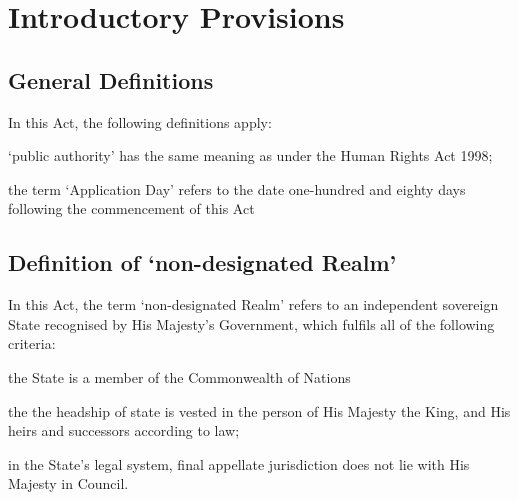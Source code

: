 \documentclass{ukbill}
\begin{document}
\chapter{Introductory Provisions}
\section{General Definitions}

\begin{numstat}
\item In this Act, the following definitions apply:
\begin{alphstat} 
	\item `public authority' has the same meaning as under the Human Rights Act 1998;
	\item the term `Application Day' refers to the date one-hundred and eighty days following the commencement of this Act
	\end{alphstat}
\end{numstat}

\section{Definition of `non-designated Realm'}
\begin{numstat}
	\item In this Act, the term `non-designated Realm' refers to an independent sovereign State recognised by His Majesty's Government, which fulfils all of the following criteria:
\begin{alphstat}
\item the State is a member of the Commonwealth of Nations
\item the the headship of state is vested in the person of His Majesty the King, and His heirs and successors according to law;
\item in the State's legal system, final appellate jurisdiction does not lie with His Majesty in Council.
  	\end{alphstat}
  \end{numstat}
\end{document}
